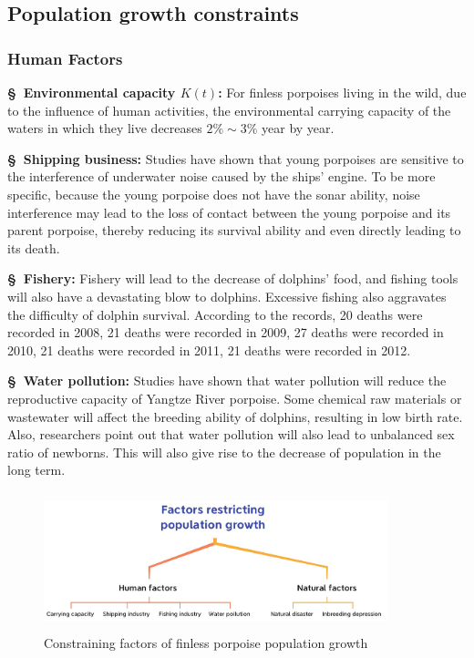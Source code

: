 \documentclass[12pt]{article}  %
\begin{document}
\subsection{Population growth constraints}
\subsubsection{Human Factors }
\textbf{\S \ Environmental capacity $K(t)$: }For finless porpoises living in the wild, due to the influence of human activities, the environmental carrying capacity of the waters in which they live decreases $2\%\sim 3\%$ year by year.

\textbf{\S \ Shipping business: }Studies have shown that young porpoises are sensitive to the interference of underwater noise caused by the ships’ engine. To be more specific, because the young porpoise does not have the sonar ability, noise interference may lead to the loss of contact between the young porpoise and its parent porpoise, thereby reducing its survival ability and even directly leading to its death.

\textbf{\S \ Fishery: }Fishery will lead to the decrease of dolphins’ food, and fishing tools will also have a devastating blow to dolphins. Excessive fishing also aggravates the difficulty of dolphin survival. According to the records, 20 deaths were recorded in 2008, 21 deaths were recorded in 2009, 27 deaths were recorded in 2010, 21 deaths were recorded in 2011, 21 deaths were recorded in 2012.

\textbf{\S \ Water pollution: } Studies have shown that water pollution will reduce the reproductive capacity of Yangtze River porpoise. Some chemical raw materials or wastewater will affect the breeding ability of dolphins, resulting in low birth rate. Also, researchers point out that water pollution will also lead to unbalanced sex ratio of newborns. This will also give rise to the decrease of population in the long term.
\begin{figure}[htbp]%
	\small
	\centering
	\includegraphics[height=4cm,width=10cm]{figures/Cons2.png}%
	\caption{Constraining factors of finless porpoise population growth}%
\end{figure}
\end{document}
